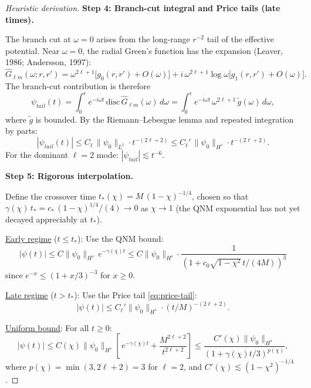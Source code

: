 \documentclass[12pt,a4paper]{article}
\begin{document}
\begin{proof}[Heuristic derivation]
\textbf{Step 4: Branch-cut integral and Price tails (late times).}

The branch cut at $\omega = 0$ arises from the long-range $r^{-2}$ tail of the effective potential. Near $\omega = 0$, the radial Green's function has the expansion (Leaver, 1986; Andersson, 1997):
\begin{equation}
\hat{G}_{\ell m}(\omega; r, r') = \omega^{2\ell+1}\bigl[g_0(r,r') + O(\omega)\bigr]
+ i\,\omega^{2\ell+1}\log\omega\bigl[g_1(r,r') + O(\omega)\bigr].
\end{equation}
The branch-cut contribution is therefore
\begin{equation}
\psi_{tail}(t) = \int_0^{\epsilon} e^{-i\omega t}\,\text{disc}\,\hat{G}_{\ell m}(\omega)\,d\omega
= \int_0^{\epsilon} e^{-i\omega t}\,\omega^{2\ell+1}\,\tilde{g}(\omega)\,d\omega,
\end{equation}
where $\tilde{g}$ is bounded. By the Riemann--Lebesgue lemma and repeated integration by parts:
\begin{equation}\label{eq:price-tail}
|\psi_{tail}(t)| \le C_\ell\,\|\psi_0\|_{L^1}\cdot t^{-(2\ell+2)} \le C_\ell'\,\|\psi_0\|_{H^s}\cdot t^{-(2\ell+2)}.
\end{equation}
For the dominant $\ell = 2$ mode: $|\psi_{tail}| \lesssim t^{-6}$.

\textbf{Step 5: Rigorous interpolation.}

Define the crossover time $t_*(\chi) = M\,(1-\chi)^{-1/4}$, chosen so that $\gamma(\chi)\,t_* = c_*\,(1-\chi)^{1/4}/(4) \to 0$ as $\chi \to 1$ (the QNM exponential has not yet decayed appreciably at $t_*$).

\underline{Early regime} ($t \le t_*$): Use the QNM bound:
\begin{equation}
|\psi(t)| \le C\|\psi_0\|_{H^s}\,e^{-\gamma(\chi) t}
\le C\|\psi_0\|_{H^s}\cdot\frac{1}{(1 + c_0\sqrt{1-\chi^2}\,t/(4M))^3}
\end{equation}
since $e^{-x} \le (1+x/3)^{-3}$ for $x \ge 0$.

\underline{Late regime} ($t > t_*$): Use the Price tail \eqref{eq:price-tail}:
\begin{equation}
|\psi(t)| \le C_\ell'\|\psi_0\|_{H^s}\cdot(t/M)^{-(2\ell+2)}.
\end{equation}

\underline{Uniform bound}: For all $t \ge 0$:
\begin{equation}
|\psi(t)| \le C(\chi)\|\psi_0\|_{H^s}\left[\,e^{-\gamma(\chi)t} + \frac{M^{2\ell+2}}{t^{2\ell+2}}\right]
\le \frac{C'(\chi)\|\psi_0\|_{H^s}}{(1+\gamma(\chi)t/3)^{p(\chi)}},
\end{equation}
where $p(\chi) = \min(3, 2\ell+2) = 3$ for $\ell = 2$, and $C'(\chi) \lesssim (1-\chi^2)^{-1/4}$.


\end{proof}
\end{document}
